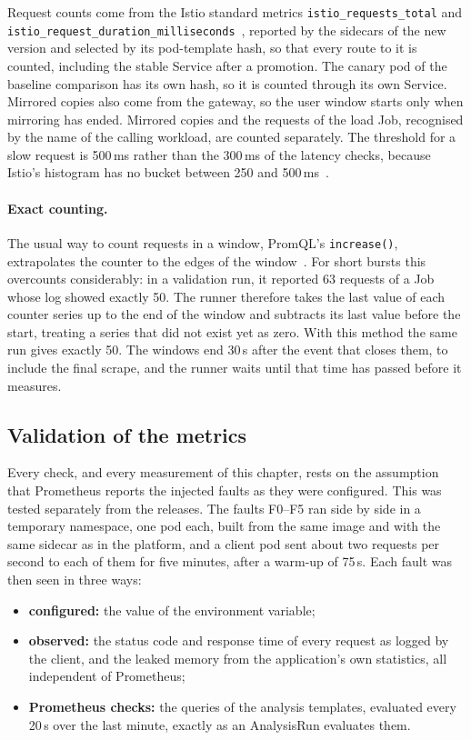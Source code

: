 Request counts come from the Istio standard metrics \texttt{istio\_requests\_total} and \texttt{istio\_request\_duration\_milliseconds}~\cite{IstioMetrics}, reported by the sidecars of the new version and selected by its pod-template hash, so that every route to it is counted, including the stable Service after a promotion. The canary pod of the baseline comparison has its own hash, so it is counted through its own Service. Mirrored copies also come from the gateway, so the user window starts only when mirroring has ended. Mirrored copies and the requests of the load Job, recognised by the name of the calling workload, are counted separately. The threshold for a slow request is 500\,ms rather than the 300\,ms of the latency checks, because Istio's histogram has no bucket between 250 and 500\,ms~\cite{PromHistograms}.

\paragraph{Exact counting.} The usual way to count requests in a window, PromQL's \texttt{increase()}, extrapolates the counter to the edges of the window~\cite{PromQL}. For short bursts this overcounts considerably: in a validation run, it reported 63 requests of a Job whose log showed exactly 50. The runner therefore takes the last value of each counter series up to the end of the window and subtracts its last value before the start, treating a series that did not exist yet as zero. With this method the same run gives exactly 50. The windows end 30\,s after the event that closes them, to include the final scrape, and the runner waits until that time has passed before it measures.

\subsection{Validation of the metrics}
\label{sec:EvalMetricValidation}
Every check, and every measurement of this chapter, rests on the assumption that Prometheus reports the injected faults as they were configured. This was tested separately from the releases. The faults F0--F5 ran side by side in a temporary namespace, one pod each, built from the same image and with the same sidecar as in the platform, and a client pod sent about two requests per second to each of them for five minutes, after a warm-up of 75\,s. Each fault was then seen in three ways:
\begin{itemize}
	\item \textbf{configured:} the value of the environment variable;
	\item \textbf{observed:} the status code and response time of every request as logged by the client, and the leaked memory from the application's own statistics, all independent of Prometheus;
	\item \textbf{Prometheus checks:} the queries of the analysis templates, evaluated every 20\,s over the last minute, exactly as an AnalysisRun evaluates them.
\end{itemize}

